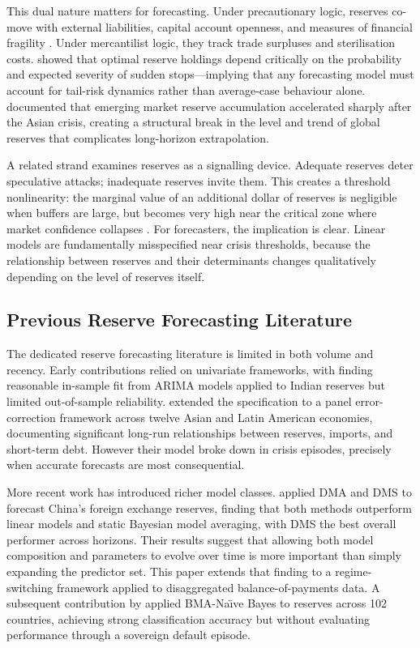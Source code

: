 \documentclass[12pt,a4paper]{article}
\begin{document}
This dual nature matters for forecasting. Under precautionary logic, reserves co-move with external liabilities, capital account openness, and measures of financial fragility \citep{Obstfeld2010}. Under mercantilist logic, they track trade surpluses and sterilisation costs. \cite{CalvoIzquierdoLooKung2013} showed that optimal reserve holdings depend critically on the probability and expected severity of sudden stops---implying that any forecasting model must account for tail-risk dynamics rather than average-case behaviour alone. \cite{Ghosh2017} documented that emerging market reserve accumulation accelerated sharply after the Asian crisis, creating a structural break in the level and trend of global reserves that complicates long-horizon extrapolation.

A related strand examines reserves as a signalling device. Adequate reserves deter speculative attacks; inadequate reserves invite them. This creates a threshold nonlinearity: the marginal value of an additional dollar of reserves is negligible when buffers are large, but becomes very high near the critical zone where market confidence collapses \citep{JeanneRanciere2011}. For forecasters, the implication is clear. Linear models are fundamentally misspecified near crisis thresholds, because the relationship between reserves and their determinants changes qualitatively depending on the level of reserves itself.

\subsection{Previous Reserve Forecasting Literature}

The dedicated reserve forecasting literature is limited in both volume and recency. Early contributions relied on univariate frameworks, with \cite{SehgalSharma2008} finding reasonable in-sample fit from ARIMA models applied to Indian reserves but limited out-of-sample reliability. \cite{Gosselin2005} extended the specification to a panel error-correction framework across twelve Asian and Latin American economies, documenting significant long-run relationships between reserves, imports, and short-term debt. However their model broke down in crisis episodes, precisely when accurate forecasts are most consequential.

More recent work has introduced richer model classes. \cite{Gupta2014} applied DMA and DMS to forecast China's foreign exchange reserves, finding that both methods outperform linear models and static Bayesian model averaging, with DMS the best overall performer across horizons. Their results suggest that allowing both model composition and parameters to evolve over time is more important than simply expanding the predictor set. This paper extends that finding to a regime-switching framework applied to disaggregated balance-of-payments data. A subsequent contribution by \cite{Salas2025} applied BMA-Na\"{\i}ve Bayes to reserves across 102 countries, achieving strong classification accuracy but without evaluating performance through a sovereign default episode.
\end{document}
